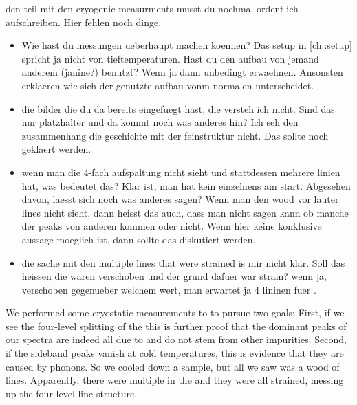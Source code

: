 			\begin{figure}[htp]
				\begin{subfigure}[t]{ 0.49\linewidth}
					\centering
					\caption{}
					\label{subfig::roomtep2}
				\end{subfigure}
				\hfill
				\begin{subfigure}[t]{ 0.49\linewidth}
					\centering
					\caption{}
					\label{subfig::cryo2}
				\end{subfigure}
				\caption[todo fix figure]{}
				\label{fig::rt_vs_cryo2}
			\end{figure}

			\begin{remark}

				den teil mit den cryogenic measurments musst du nochmal ordentlich aufschreiben. Hier fehlen noch dinge.

				\begin{itemize}
					\item Wie hast du messungen ueberhaupt machen koennen? Das setup in \autoref{ch::setup} spricht ja nicht von tieftemperaturen. Hast du den aufbau von jemand anderem (janine?) benutzt? Wenn ja dann unbedingt erwaehnen. Ansonsten erklaeren wie sich der genutzte aufbau vonm normalen unterscheidet.
					\item die bilder die du da bereits eingefuegt hast, die versteh ich  nicht. Sind das nur platzhalter und da kommt noch was anderes hin? Ich seh den zusammenhang die geschichte mit der feinstruktur nicht. Das sollte noch geklaert werden.
					\item wenn man die 4-fach aufspaltung nicht sieht und stattdessen mehrere linien hat, was bedeutet das? Klar ist, man hat kein einzelnens \siv am start. Abgesehen davon, laesst sich noch was anderes sagen? Wenn man den wood vor lauter lines nicht sieht, dann heisst das auch, dass man nicht sagen kann ob manche der \psb peaks von anderen \sivs kommen oder nicht. Wenn hier keine konklusive aussage moeglich ist, dann sollte das diskutiert werden. 
					\item die sache mit den multiple lines that were strained is mir nicht klar. Soll das heissen die waren verschoben und der grund dafuer war strain? wenn ja, verschoben gegenueber welchem wert, man erwartet ja 4 lininen fuer \sivs.
				\end{itemize}
			\end{remark}

			We performed some cryostatic measurements to to pursue two goals:
			First, if we see the four-level splitting of the \ZPL this is further proof that the dominant peaks of our spectra are indeed all due to \sivs and do not stem from other impurities.
			Second, if the sideband peaks vanish at cold temperatures, this is evidence that they are caused by phonons.
			So we cooled down a sample, but all we saw was a wood of lines.
			Apparently, there were multiple \sivs in the \nds and they were all strained, messing up the four-level line structure.
